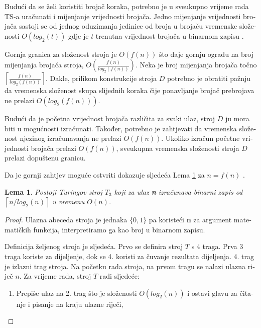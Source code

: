 \documentclass[12pt]{rectors}
\newtheorem{lemma}[theorem]{Lema}
\begin{document}
\begin{otherlanguage}{croatian}
Budući da se želi koristiti brojač koraka, potrebno je u sveukupno vrijeme rada TS-a
uračunati i mijenjanje vrijednosti brojača. Jedno mijenjanje vrijednosti brojača sastoji se od jednog oduzimanja jedinice od broja u brojaču vremenske složenosti
$O(log_2(t))$ gdje je $t$ trenutna vrijednost brojača u binarnom zapisu \cite{counterCop,counterCop2}.


Gornja granica za složenost stroja je $O(f(n))$ što daje gornju ogradu na broj mijenjanja brojača stroja, $O(\frac {f\left ( n \right )}{log_2\left ( f\left ( n \right ) \right )})$. Neka je broj mijenjanja brojača točno $\left \lceil \frac {f\left ( n \right )}{log_2\left ( f\left ( n \right ) \right )} \right \rceil$\label{broj_koraka}.
Dakle, prilikom konstrukcije stroja $D$ potrebno je obratiti pažnju
da vremenska složenost skupa slijednih koraka čije ponavljanje brojač prebrojava ne prelazi $O(log_2(f(n)))$.

Budući da je početna vrijednost brojača različita za svaki ulaz, stroj $D$ ju
mora biti u mogućnosti izračunati. Također, potrebno je zahtjevati da vremenska složenost
njezinog izračunavanja ne prelazi $O(f(n))$. Ukoliko izračun početne vrijednosti brojača prelazi 
$O(f(n))$, sveukupna vremenska složenosti stroja $D$ prelazi dopuštenu granicu.

Da je gornji zahtjev moguće ostvriti dokazuje sljedeća Lema \ref{lemma:t3} za $n=f(n)$ .
\begin{lemma}\label{lemma:t3}	
Postoji Turingov stroj $T_3$ koji za ulaz \textbf{n} izračunava binarni zapis od $\left \lceil{ n/log_2(n) }\right \rceil$ u vremenu $O(n)$.  
\end{lemma}
\begin{proof}
Ulazna abeceda stroja je jednaka $\{0,1\}$ pa koristeći \textbf{n} za argument matematičkih funkcija, interpretiramo ga kao broj u binarnom zapisu. 	

Definicija željenog stroja je sljedeća.
Prvo se definira stroj $T$ s 4 traga.
Prva 3 traga koriste za dijeljenje, dok se 4. koristi za čuvanje rezultata dijeljenja. 4. trag je izlazni trag stroja. 
Na početku rada stroja, na prvom tragu se nalazi ulazna riječ $n$. \newline
Za vrijeme rada, stroj $T$ radi sljedeće:
\begin{enumerate}
    \item Prepiše ulaz na 2. trag što je složenosti $O(log_2(n))$ i ostavi glavu za čitanje i pisanje na kraju ulazne riječi,
    

\end{enumerate}
\end{proof}
\end{otherlanguage}
\end{document}
